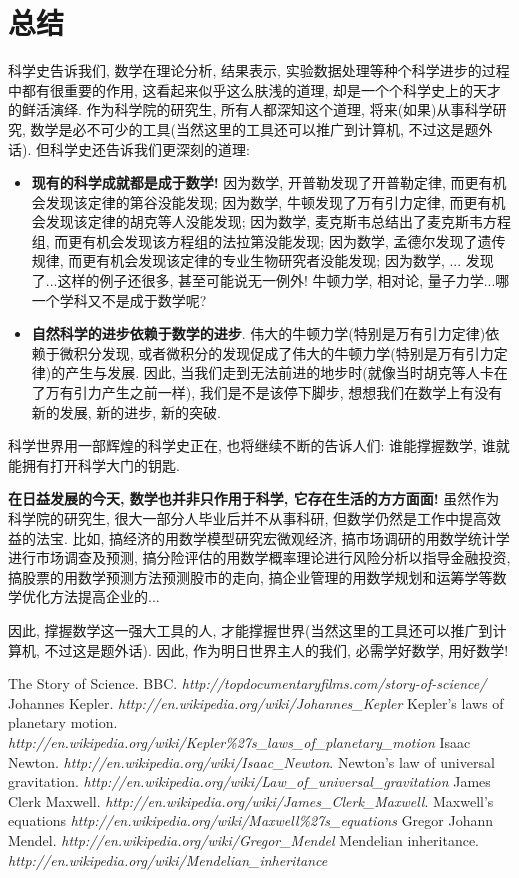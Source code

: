 \documentclass[11pt,a4paper,boxed]{caspset}
\begin{document}
\section{总结}
科学史告诉我们, 数学在理论分析, 结果表示, 实验数据处理等种个科学进步的过程中都有很重要的作用, 这看起来似乎这么肤浅的道理, 却是一个个科学史上的天才的鲜活演绎. 作为科学院的研究生, 所有人都深知这个道理,  将来(如果)从事科学研究, 数学是必不可少的工具(当然这里的工具还可以推广到计算机, 不过这是题外话). 但科学史还告诉我们更深刻的道理:
\begin{itemize}
\item \textbf{现有的科学成就都是成于数学!}
因为数学, 开普勒发现了开普勒定律, 而更有机会发现该定律的第谷没能发现; 因为数学, 牛顿发现了万有引力定律, 而更有机会发现该定律的胡克等人没能发现; 因为数学, 麦克斯韦总结出了麦克斯韦方程组, 而更有机会发现该方程组的法拉第没能发现;
因为数学, 孟德尔发现了遗传规律, 而更有机会发现该定律的专业生物研究者没能发现; 因为数学, ... 发现了...这样的例子还很多, 甚至可能说无一例外! 牛顿力学, 相对论, 量子力学...哪一个学科又不是成于数学呢?
\item \textbf{自然科学的进步依赖于数学的进步}. 伟大的牛顿力学(特别是万有引力定律)依赖于微积分发现, 或者微积分的发现促成了伟大的牛顿力学(特别是万有引力定律)的产生与发展.
因此, 当我们走到无法前进的地步时(就像当时胡克等人卡在了万有引力产生之前一样),
我们是不是该停下脚步, 想想我们在数学上有没有新的发展, 新的进步, 新的突破.
\end{itemize}
科学世界用一部辉煌的科学史正在, 也将继续不断的告诉人们: 谁能撑握数学, 谁就能拥有打开科学大门的钥匙.

\textbf{在日益发展的今天, 数学也并非只作用于科学, 它存在生活的方方面面!} 虽然作为科学院的研究生, 很大一部分人毕业后并不从事科研, 但数学仍然是工作中提高效益的法宝. 比如, 搞经济的用数学模型研究宏微观经济, 搞市场调研的用数学统计学进行市场调查及预测, 搞分险评估的用数学概率理论进行风险分析以指导金融投资, 搞股票的用数学预测方法预测股市的走向, 搞企业管理的用数学规划和运筹学等数学优化方法提高企业的...

因此, 撑握数学这一强大工具的人, 才能撑握世界(当然这里的工具还可以推广到计算机, 不过这是题外话). 因此, 作为明日世界主人的我们, 必需学好数学, 用好数学!



\begin{thebibliography}{99}
 The Story of Science. BBC. \textit{http://topdocumentaryfilms.com/story-of-science/}
 Johannes Kepler. \textit{http://en.wikipedia.org/wiki/Johannes\_Kepler}
 Kepler's laws of planetary motion. \\ \textit{http://en.wikipedia.org/wiki/Kepler\%27s\_laws\_of\_planetary\_motion}
 Isaac Newton. \textit{http://en.wikipedia.org/wiki/Isaac\_Newton}.
\bibitem{}Newton's law of universal gravitation. \textit{http://en.wikipedia.org/wiki/Law\_of\_universal\_gravitation}
 James Clerk Maxwell. \textit{http://en.wikipedia.org/wiki/James\_Clerk\_Maxwell}.
 Maxwell's equations
    \textit{http://en.wikipedia.org/wiki/Maxwell\%27s\_equations}
 Gregor Johann Mendel. \textit{http://en.wikipedia.org/wiki/Gregor\_Mendel}
 Mendelian inheritance.
    \textit{http://en.wikipedia.org/wiki/Mendelian\_inheritance}
\end{thebibliography}
\end{document}
